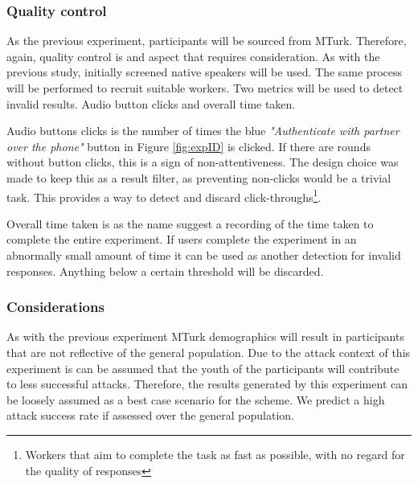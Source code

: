\subsubsection{Quality control}
\label{sec:exp2_quality}
As the previous experiment, participants will be sourced from MTurk. Therefore, again, quality control is and aspect that requires consideration. As with the previous study, initially screened native speakers will be used. The same process will be performed to recruit suitable workers. Two metrics will be used to detect invalid results. Audio button clicks and overall time taken. 

Audio buttons clicks is the number of times the blue \textit{"Authenticate with partner over the phone"} button in Figure \ref{fig:expID} is clicked. If there are rounds without button clicks, this is a sign of non-attentiveness. The design choice was made to keep this as a result filter, as preventing non-clicks would be a trivial task. This provides a way to detect and discard click-throughs\footnote{Workers that aim to complete the task as fast as possible, with no regard for the quality of responses}. 

Overall time taken is as the name suggest a recording of the time taken to complete the entire experiment. If users complete the experiment in an abnormally small amount of time it can be used as another detection for invalid responses. Anything below a certain threshold will be discarded.

\subsubsection{Considerations}
As with the previous experiment MTurk demographics will result in participants that are not reflective of the general population. Due to the attack context of this experiment is can be assumed that the youth of the participants will contribute to less successful attacks. Therefore, the results generated by this experiment can be loosely assumed as a best case scenario for the scheme. We predict a high attack success rate if assessed over the general population.